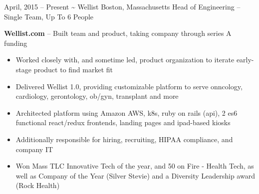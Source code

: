 \documentclass[]{friggeri-cv}
\begin{document}
\begin{entrylist}
  \entryalt
    {April, 2015 -- Present}
    {\textbf{\textasciitilde} Wellist}
    {Boston, Massachusetts}
    {Head of Engineering -- Single Team, Up To 6 People}
    {\textbf{Wellist.com} -- Built team and product, taking company through series A funding
    \begin{itemize}
      \item Worked closely with, and sometime led, product organization to iterate early-stage product to find market fit
      \item Delivered Wellist 1.0, providing customizable platform to serve onncology, cardiology, gerontology, ob/gyn, transplant and more
      \item Architected platform using Amazon AWS, k8s, ruby on rails (api), 2 es6 functional react/redux frontends, landing pages and ipad-based kiosks
      \item Additionally responsible for hiring, recruiting, HIPAA compliance, and company IT
      \item Won Mass TLC Innovative Tech of the year, and 50 on Fire - Health Tech, as well as Company of the Year (Silver Stevie) and a Diversity Leadership award (Rock Health)
    \end{itemize}}


\end{entrylist}
\end{document}
